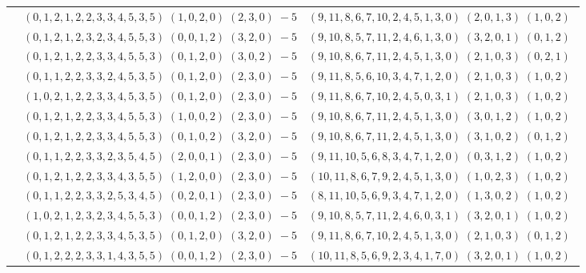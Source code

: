 \documentclass[11pt]{article}
\begin{document}
\begin{longtable}[l]{|c|c|c|}
 \cline{2-3} 
 & $(0 ,1 ,2 ,1 ,2 ,2 ,3 ,3 ,4 ,5 ,3 ,5) \;(1 ,0 ,2 ,0) \;(2 ,3 ,0) \;-5$ & $(9 ,11 ,8 ,6 ,7 ,10 ,2 ,4 ,5 ,1 ,3 ,0) \;(2 ,0 ,1 ,3) \;(1 ,0 ,2) \;$\\ 
 \cline{2-3} 
 & $(0 ,1 ,2 ,1 ,2 ,3 ,2 ,3 ,4 ,5 ,5 ,3) \;(0 ,0 ,1 ,2) \;(3 ,2 ,0) \;-5$ & $(9 ,10 ,8 ,5 ,7 ,11 ,2 ,4 ,6 ,1 ,3 ,0) \;(3 ,2 ,0 ,1) \;(0 ,1 ,2) \;$\\ 
 \cline{2-3} 
 & $(0 ,1 ,2 ,1 ,2 ,2 ,3 ,3 ,4 ,5 ,5 ,3) \;(0 ,1 ,2 ,0) \;(3 ,0 ,2) \;-5$ & $(9 ,10 ,8 ,6 ,7 ,11 ,2 ,4 ,5 ,1 ,3 ,0) \;(2 ,1 ,0 ,3) \;(0 ,2 ,1) \;$\\ 
 \cline{2-3} 
 & $(0 ,1 ,1 ,2 ,2 ,3 ,3 ,2 ,4 ,5 ,3 ,5) \;(0 ,1 ,2 ,0) \;(2 ,3 ,0) \;-5$ & $(9 ,11 ,8 ,5 ,6 ,10 ,3 ,4 ,7 ,1 ,2 ,0) \;(2 ,1 ,0 ,3) \;(1 ,0 ,2) \;$\\ 
 \cline{2-3} 
 & $(1 ,0 ,2 ,1 ,2 ,2 ,3 ,3 ,4 ,5 ,3 ,5) \;(0 ,1 ,2 ,0) \;(2 ,3 ,0) \;-5$ & $(9 ,11 ,8 ,6 ,7 ,10 ,2 ,4 ,5 ,0 ,3 ,1) \;(2 ,1 ,0 ,3) \;(1 ,0 ,2) \;$\\ 
 \cline{2-3} 
 & $(0 ,1 ,2 ,1 ,2 ,2 ,3 ,3 ,4 ,5 ,5 ,3) \;(1 ,0 ,0 ,2) \;(2 ,3 ,0) \;-5$ & $(9 ,10 ,8 ,6 ,7 ,11 ,2 ,4 ,5 ,1 ,3 ,0) \;(3 ,0 ,1 ,2) \;(1 ,0 ,2) \;$\\ 
 \cline{2-3} 
 & $(0 ,1 ,2 ,1 ,2 ,2 ,3 ,3 ,4 ,5 ,5 ,3) \;(0 ,1 ,0 ,2) \;(3 ,2 ,0) \;-5$ & $(9 ,10 ,8 ,6 ,7 ,11 ,2 ,4 ,5 ,1 ,3 ,0) \;(3 ,1 ,0 ,2) \;(0 ,1 ,2) \;$\\ 
 \cline{2-3} 
 & $(0 ,1 ,1 ,2 ,2 ,3 ,3 ,2 ,3 ,5 ,4 ,5) \;(2 ,0 ,0 ,1) \;(2 ,3 ,0) \;-5$ & $(9 ,11 ,10 ,5 ,6 ,8 ,3 ,4 ,7 ,1 ,2 ,0) \;(0 ,3 ,1 ,2) \;(1 ,0 ,2) \;$\\ 
 \cline{2-3} 
 & $(0 ,1 ,2 ,1 ,2 ,2 ,3 ,3 ,4 ,3 ,5 ,5) \;(1 ,2 ,0 ,0) \;(2 ,3 ,0) \;-5$ & $(10 ,11 ,8 ,6 ,7 ,9 ,2 ,4 ,5 ,1 ,3 ,0) \;(1 ,0 ,2 ,3) \;(1 ,0 ,2) \;$\\ 
 \cline{2-3} 
 & $(0 ,1 ,1 ,2 ,2 ,3 ,3 ,2 ,5 ,3 ,4 ,5) \;(0 ,2 ,0 ,1) \;(2 ,3 ,0) \;-5$ & $(8 ,11 ,10 ,5 ,6 ,9 ,3 ,4 ,7 ,1 ,2 ,0) \;(1 ,3 ,0 ,2) \;(1 ,0 ,2) \;$\\ 
 \cline{2-3} 
 & $(1 ,0 ,2 ,1 ,2 ,3 ,2 ,3 ,4 ,5 ,5 ,3) \;(0 ,0 ,1 ,2) \;(2 ,3 ,0) \;-5$ & $(9 ,10 ,8 ,5 ,7 ,11 ,2 ,4 ,6 ,0 ,3 ,1) \;(3 ,2 ,0 ,1) \;(1 ,0 ,2) \;$\\ 
 \cline{2-3} 
 & $(0 ,1 ,2 ,1 ,2 ,2 ,3 ,3 ,4 ,5 ,3 ,5) \;(0 ,1 ,2 ,0) \;(3 ,2 ,0) \;-5$ & $(9 ,11 ,8 ,6 ,7 ,10 ,2 ,4 ,5 ,1 ,3 ,0) \;(2 ,1 ,0 ,3) \;(0 ,1 ,2) \;$\\ 
 \cline{2-3} 
 & $(0 ,1 ,2 ,2 ,2 ,3 ,3 ,1 ,4 ,3 ,5 ,5) \;(0 ,0 ,1 ,2) \;(2 ,3 ,0) \;-5$ & $(10 ,11 ,8 ,5 ,6 ,9 ,2 ,3 ,4 ,1 ,7 ,0) \;(3 ,2 ,0 ,1) \;(1 ,0 ,2) \;$\\ 

\end{longtable}
\end{document}
